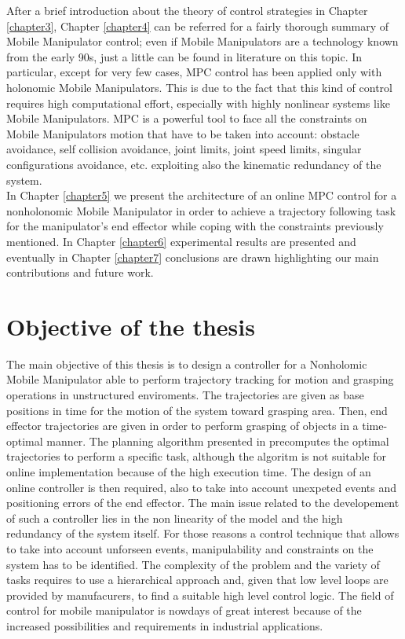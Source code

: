 After a brief introduction about the theory of control strategies in Chapter \ref{chapter3}, Chapter \ref{chapter4} can be referred for a fairly thorough summary of Mobile Manipulator control; even if Mobile Manipulators are a technology known from the early 90s, just a little can be found in literature on this topic. In particular, except for very few cases, MPC control has been applied only with holonomic Mobile Manipulators. This is due to the fact that this kind of control requires high computational effort, especially with highly nonlinear systems like Mobile Manipulators. MPC is a powerful tool to face all the constraints on Mobile Manipulators motion that have to be taken into account: obstacle avoidance, self collision avoidance, joint limits, joint speed limits, singular configurations avoidance, etc. exploiting also the kinematic redundancy of the system.\\
In Chapter \ref{chapter5} we present the architecture of an online MPC control for a nonholonomic Mobile Manipulator in order to achieve a trajectory following task for the manipulator's end effector while coping with the constraints previously mentioned. In Chapter \ref{chapter6} experimental results are presented and eventually in Chapter \ref{chapter7} conclusions are drawn highlighting our main contributions and future work.	

\section{Objective of the thesis}
The main objective of this thesis is to design a controller for a Nonholomic Mobile Manipulator able to perform trajectory tracking for motion and grasping operations in unstructured enviroments. The trajectories are given as base positions in time for the motion of the system toward grasping area. Then, end effector trajectories are given in order to perform grasping of objects in a time-optimal manner. The planning algorithm presented in \cite{shantanuthakar} precomputes the optimal trajectories to perform a specific task, although the algoritm is not suitable for online implementation because of the high execution time. The design of an online controller is then required, also to take into account unexpeted events and positioning errors of the end effector. The main issue related to the developement of such a controller lies in the non linearity of the model and the high redundancy of the system itself. For those reasons a control technique that allows to take into account unforseen events, manipulability and constraints on the system has to be identified. The complexity of the problem and the variety of tasks requires to use a hierarchical approach and, given that low level loops are provided by manufacurers, to find a suitable high level control logic. The field of control for mobile manipulator is nowdays of great interest because of the increased possibilities and requirements in industrial applications.  



